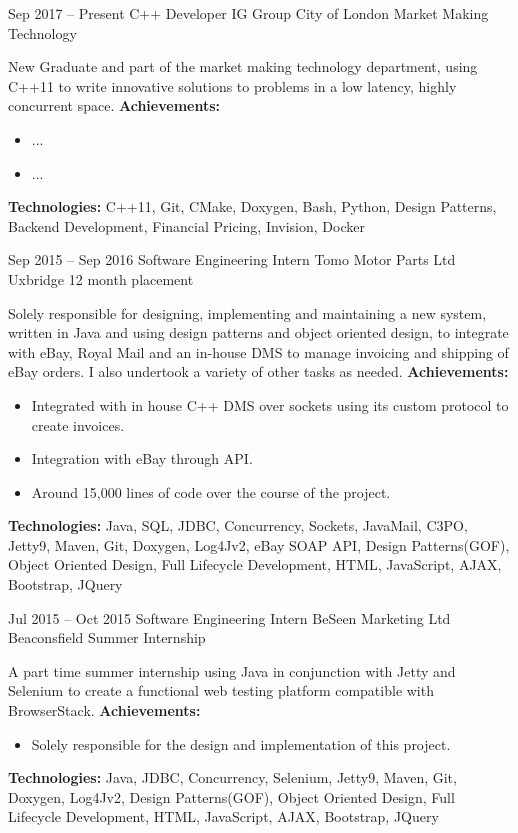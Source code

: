 \cventry
{Sep 2017 -- Present}
{C++ Developer}
{IG Group}
{City of London}
{Market Making Technology}
{New Graduate and part of the market making technology department, using C++11 to write innovative solutions to problems in a low latency, highly concurrent space. \newline{}
\textbf{Achievements:}
	{\begin{itemize}
		\item{...}
		\item{...}
	\end{itemize}}
\textbf{Technologies:} {\scriptsize C++11, Git, CMake, Doxygen, Bash, Python, Design Patterns, Backend Development, Financial Pricing, Invision, Docker\newline{} }
}

\cventry
{Sep 2015 -- Sep 2016}
{Software Engineering Intern}
{Tomo Motor Parts Ltd}
{Uxbridge}
{12 month placement}
{Solely responsible for designing, implementing and maintaining a new system, written in Java and using design patterns and object oriented design, to integrate with eBay, Royal Mail and an in-house DMS to manage invoicing and shipping of eBay orders. I also undertook a variety of other tasks as needed.\newline{}
\textbf{Achievements:}
	{\begin{itemize}
		\item{Integrated with in house C++ DMS over sockets using its custom protocol to create invoices.}
		\item{Integration with eBay through API.}
		\item{Around 15,000 lines of code over the course of the project.}
	\end{itemize}}
\textbf{Technologies:} {\scriptsize Java, SQL, JDBC, Concurrency, Sockets, JavaMail, C3PO, Jetty9, Maven, Git, Doxygen, Log4Jv2, eBay SOAP API, Design Patterns(GOF), Object Oriented Design, Full Lifecycle Development, HTML, JavaScript, AJAX, Bootstrap, JQuery\newline{} }
}


\cventry
{Jul 2015 -- Oct 2015}
{Software Engineering Intern}
{BeSeen Marketing Ltd}
{Beaconsfield}
{Summer Internship}
{A part time summer internship using Java in conjunction with Jetty and Selenium to create a functional web testing platform compatible with BrowserStack.\newline{}
\textbf{Achievements:}
	{\begin{itemize}
		\item{Solely responsible for the design and implementation of this project.}
	\end{itemize}}
\textbf{Technologies:} {\scriptsize Java, JDBC, Concurrency, Selenium, Jetty9, Maven, Git, Doxygen, Log4Jv2, Design Patterns(GOF), Object Oriented Design, Full Lifecycle Development, HTML, JavaScript, AJAX, Bootstrap, JQuery\newline{} }}

